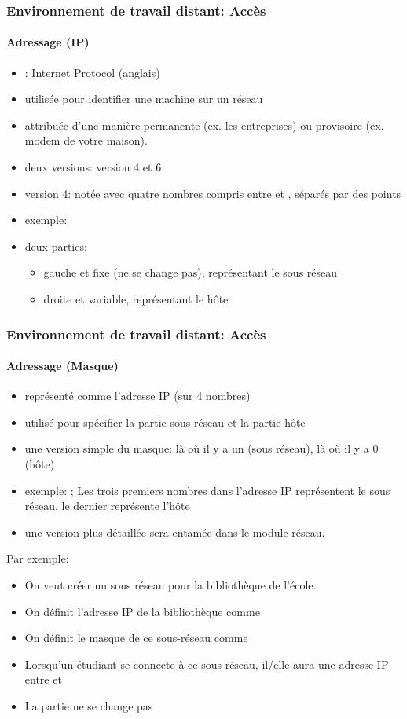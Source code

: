 \documentclass[xcolor=table]{beamer}
\begin{document}
\begin{frame}
\frametitle{Environnement de travail distant: Accès}
\framesubtitle{Adressage (IP)}

\begin{itemize}
	\item {}: Internet Protocol (anglais)
	\item utilisée pour identifier une machine sur un réseau
	\item attribuée d'une manière permanente (ex. les entreprises) ou provisoire (ex. modem de votre maison). 
	\item deux versions:  version 4 et 6. 
	\item version 4: notée avec quatre nombres compris entre  et , séparés par des points
	\item exemple: 
	\item deux parties: 
	\begin{itemize}
		\item gauche et fixe (ne se change pas), représentant le sous réseau 
		\item droite et variable, représentant le hôte
	\end{itemize}
\end{itemize}


\end{frame}

\begin{frame}
\frametitle{Environnement de travail distant: Accès}
\framesubtitle{Adressage (Masque)}

\begin{itemize}
	\item représenté comme l'adresse IP (sur 4 nombres)
	\item utilisé pour spécifier la partie sous-réseau et la partie hôte
	\item une version simple du masque: là où il y a un  (sous réseau), là où il y a 0 (hôte)
	\item exemple: ; Les trois premiers nombres dans l'adresse IP représentent le sous réseau, le dernier représente l'hôte 
	\item une version plus détaillée sera entamée dans le module réseau.
\end{itemize}

Par exemple: 
\begin{itemize}
	\item On veut créer un sous réseau pour la bibliothèque de l'école. 
	\item On définit l'adresse IP de la bibliothèque comme 
	\item On définit le masque de ce sous-réseau comme 
	\item Lorsqu'un étudiant se connecte à ce sous-réseau, il/elle aura une adresse IP entre  et  
	\item La partie  ne se change pas 
\end{itemize}




\end{frame}
\end{document}
